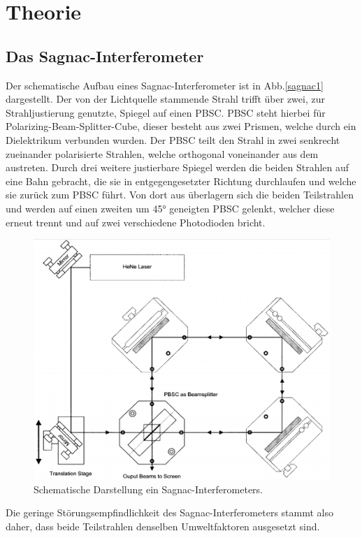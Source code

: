 \section{Theorie}
\subsection{Das Sagnac-Interferometer}
Der schematische Aufbau eines Sagnac-Interferometer ist in Abb.\ref{sagnac1} dargestellt.
Der von der Lichtquelle stammende Strahl trifft über zwei, zur Strahljustierung genutzte,
Spiegel auf einen PBSC. PBSC steht hierbei für  Polarizing-Beam-Splitter-Cube, dieser besteht aus zwei Prismen, welche durch ein
Dielektrikum verbunden wurden. Der PBSC teilt den Strahl in zwei senkrecht zueinander
polarisierte Strahlen, welche orthogonal voneinander aus dem austreten. Durch drei weitere justierbare Spiegel werden die beiden Strahlen auf eine Bahn gebracht, die sie in entgegengesetzter Richtung durchlaufen
und welche sie zurück zum PBSC führt. Von dort aus überlagern sich die beiden Teilstrahlen und werden auf einen zweiten um 45° geneigten PBSC gelenkt, welcher diese erneut trennt
und auf zwei verschiedene Photodioden bricht.
\begin{figure}[H]
  \centering
  \includegraphics[scale=0.4]{Bilder/schema.png}
  \caption{Schematische Darstellung ein Sagnac-Interferometers.\cite{anleitung}}
  \label{aufbauschema}
\end{figure}
Die geringe Störungsempfindlichkeit des Sagnac-Interferometers stammt also daher, dass beide Teilstrahlen denselben Umweltfaktoren ausgesetzt sind.
